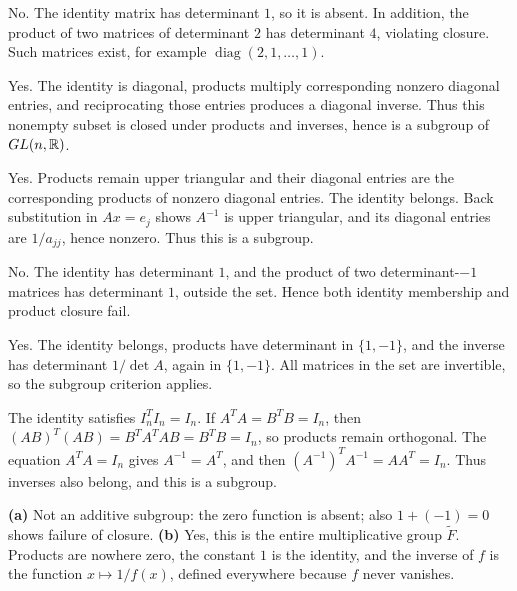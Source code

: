 
No. The identity matrix has determinant $1$, so it is absent. In addition, the product of two matrices of determinant $2$ has determinant $4$, violating closure. Such matrices exist, for example $\operatorname{diag}(2,1,\ldots,1)$.


Yes. The identity is diagonal, products multiply corresponding nonzero diagonal entries, and reciprocating those entries produces a diagonal inverse. Thus this nonempty subset is closed under products and inverses, hence is a subgroup of $GL(n,\mathbb{R})$.


Yes. Products remain upper triangular and their diagonal entries are the corresponding products of nonzero diagonal entries. The identity belongs. Back substitution in $Ax=e_j$ shows $A^{-1}$ is upper triangular, and its diagonal entries are $1/a_{jj}$, hence nonzero. Thus this is a subgroup.


No. The identity has determinant $1$, and the product of two determinant-$-1$ matrices has determinant $1$, outside the set. Hence both identity membership and product closure fail.


Yes. The identity belongs, products have determinant in $\{1,-1\}$, and the inverse has determinant $1/\det A$, again in $\{1,-1\}$. All matrices in the set are invertible, so the subgroup criterion applies.


The identity satisfies $I_n^TI_n=I_n$. If $A^TA=B^TB=I_n$, then $(AB)^T(AB)=B^TA^TAB=B^TB=I_n$, so products remain orthogonal. The equation $A^TA=I_n$ gives $A^{-1}=A^T$, and then $(A^{-1})^TA^{-1}=AA^T=I_n$. Thus inverses also belong, and this is a subgroup.


\textbf{(a)} Not an additive subgroup: the zero function is absent; also $1+(-1)=0$ shows failure of closure. \textbf{(b)} Yes, this is the entire multiplicative group $\widetilde F$. Products are nowhere zero, the constant $1$ is the identity, and the inverse of $f$ is the function $x\mapsto1/f(x)$, defined everywhere because $f$ never vanishes.

